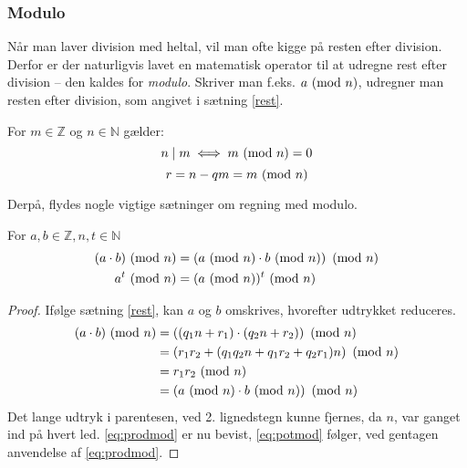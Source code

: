 \subsubsection{Modulo}
Når man laver division med heltal, vil man ofte kigge på resten efter division.
Derfor er der naturligvis lavet en matematisk operator til at udregne rest efter division -- den kaldes for \emph{modulo}.
Skriver man f.eks. \(a \ (\mathrm{mod}\ n)\), udregner man resten efter division, som angivet i sætning \ref{rest}.

\begin{definition}
    For \(m \in \mathbb{Z}\) og \(n \in \mathbb{N}\) gælder:
    \[n \mid m \iff m \ (\mathrm{mod}\ n) = 0\]
    \[r = n - q m = m \ (\mathrm{mod}\ n)\]%
\end{definition}

Derpå, flydes nogle vigtige sætninger om regning med modulo.
\begin{sent}
    \label{modmod}
    For \(a, b \in \mathbb{Z}, n, t \in \mathbb{N}\)
    \begin{align}
        (a \cdot b) \ (\mathrm{mod}\ n) &= \left(a \ (\mathrm{mod}\ n) \cdot b \ (\mathrm{mod}\ n)\right) \ (\mathrm{mod}\ n)\label{eq:prodmod}\\
        a^t \ (\mathrm{mod}\ n)         &= (a \ (\mathrm{mod}\ n))^t \ (\mathrm{mod}\ n)\label{eq:potmod}
    \end{align}
\end{sent}

\begin{proof}
    Ifølge sætning \ref{rest}, kan \(a\) og \(b\) omskrives, hvorefter udtrykket reduceres.
    \begin{align*}
(a \cdot b) \ (\mathrm{mod}\ n) &= \left((q_1 n + r_1) \cdot (q_2 n + r_2)\right) \ (\mathrm{mod}\ n)\\
                    &= \left( r_1 r_2 + (q_1 q_2 n + q_1 r_2 + q_2 r_1)n \right) \ (\mathrm{mod}\ n)\\
                    &= r_1 r_2 \ (\mathrm{mod}\ n)\\
                    &= \left(a \ (\mathrm{mod}\ n) \cdot b \ (\mathrm{mod}\ n)\right) \ (\mathrm{mod}\ n)
    \end{align*}
    Det lange udtryk i parentesen, ved 2. lignedstegn kunne fjernes, da \(n\), var ganget ind på hvert led.
    \eqref{eq:prodmod} er nu bevist, \eqref{eq:potmod} følger, ved gentagen anvendelse af \eqref{eq:prodmod}.
\end{proof}




